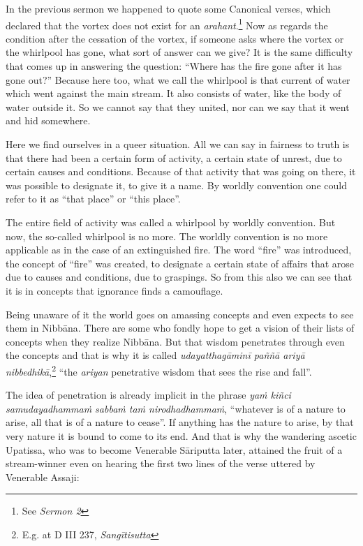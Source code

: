 In the previous sermon we happened to quote some Canonical verses, which declared that the vortex does not exist for an \emph{arahant}.\footnote{See \emph{Sermon 2}} Now as regards the condition after the cessation of the vortex, if someone asks where the vortex or the whirlpool has gone, what sort of answer can we give? It is the same difficulty that comes up in answering the question: ``Where has the fire gone after it has gone out?'' Because here too, what we call the whirlpool is that current of water which went against the main stream. It also consists of water, like the body of water outside it. So we cannot say that they united, nor can we say that it went and hid somewhere.

Here we find ourselves in a queer situation. All we can say in fairness to truth is that there had been a certain form of activity, a certain state of unrest, due to certain causes and conditions. Because of that activity that was going on there, it was possible to designate it, to give it a name. By worldly convention one could refer to it as ``that place'' or ``this place''.

The entire field of activity was called a whirlpool by worldly convention. But now, the so-called whirlpool is no more. The worldly convention is no more applicable as in the case of an extinguished fire. The word ``fire'' was introduced, the concept of ``fire'' was created, to designate a certain state of affairs that arose due to causes and conditions, due to graspings. So from this also we can see that it is in concepts that ignorance finds a camouflage.

Being unaware of it the world goes on amassing concepts and even expects to see them in Nibbāna. There are some who fondly hope to get a vision of their lists of concepts when they realize Nibbāna. But that wisdom penetrates through even the concepts and that is why it is called \emph{udayatthagāminī paññā ariyā nibbedhikā},\footnote{E.g. at D III 237, \emph{Sangītisutta}} ``the \emph{ariyan} penetrative wisdom that sees the rise and fall''.

The idea of penetration is already implicit in the phrase \emph{yaṁ kiñci samudayadhammaṁ sabbaṁ taṁ nirodhadhammaṁ}, ``whatever is of a nature to arise, all that is of a nature to cease''. If anything has the nature to arise, by that very nature it is bound to come to its end. And that is why the wandering ascetic Upatissa, who was to become Venerable Sāriputta later, attained the fruit of a stream-winner even on hearing the first two lines of the verse uttered by Venerable Assaji:

